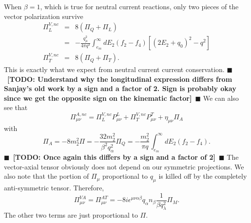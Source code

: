 \documentclass[12pt,letter]{article}
\newcommand{\todo}[1]{{$\blacksquare$~\textbf{\color{blue}[TODO: #1]}}~$\blacksquare$}
\begin{document}
When $\beta=1$, which is true for neutral current reactions, only two pieces of 
the vector polarization survive  
\begin{eqnarray}
\Pi_L^{V,nc} &=& 8(\Pi_Q + \Pi_L) \nonumber \\
&=& -\frac{q_\mu^2}{4 \pi q^3} \int_{e_m}^\infty dE_2 (f_2 - f_4) 
\left[(2 E_2 + q_0)^2 - q^2 \right] \\
\Pi_T^{V,nc} &=& 8 (\Pi_Q + \Pi_T).
\end{eqnarray}
This is exactly what we expect from neutral current current conservation. 
\todo{Understand why the longitudinal expression differs from Sanjay's old work 
by a sign and a factor of 2. Sign is probably okay since we get the opposite sign
on the kinematic factor}
We can also see that 
\begin{equation}
\Pi^{A,nc}_{\mu \nu} = \Pi^{V,nc}_L P^L_{\mu \nu} + \Pi^{V,nc}_T P^T_{\mu \nu} 
+ \eta_{\mu \nu} \Pi_A
\end{equation}
with 
\begin{equation}
\Pi_A =-8 m_2^2 \Pi = -\frac{32 m_2^2}{\beta^2 q_\alpha^2} \Pi_Q
= -\frac{m_2^2}{\pi q} \int_{e_m}^\infty dE_2 (f_2 - f_4). 
\end{equation}
\todo{Once again this differs by a sign and a factor of 2} 
The vector-axial tensor obviously does not depend on our symmetric projections.
We also note that the portion of $\Pi_\mu$ proportional to $q_\mu$ is killed off
by the completely anti-symmetric tensor. Therefore,
\begin{equation}
\Pi^{VA}_{\mu \nu} = \Pi^{AT}_{\mu \nu} 
=- 8 i \epsilon^{\mu \nu \alpha \beta} q_\alpha n_\beta \frac{1}{\beta q_\lambda^2}
\Pi_M.
\end{equation}
The other two terms are just proportional to $\Pi$.
\end{document}
